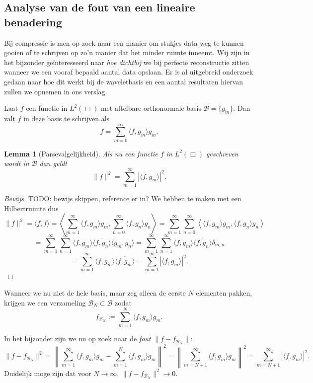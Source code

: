 \documentclass[11pt]{report}
\theoremstyle{plain}
\newtheorem*{lemm}{Lemma}
\theoremstyle{remark}
\begin{document}
\subsection{Analyse van de fout van een lineaire benadering}
Bij compressie is men op zoek naar een manier om stukjes data weg te kunnen gooien of te schrijven op zo'n manier dat het minder ruimte inneemt. Wij zijn in het bijzonder ge\"interesseerd naar \emph{hoe dichtbij} we bij perfecte reconstructie zitten wanneer we een vooraf bepaald aantal data opslaan. Er is al uitgebreid onderzoek gedaan naar hoe dit werkt bij de waveletbasis en een aantal resultaten hiervan zullen we opnemen in ons verslag.

Laat $f$ een functie in $L^2(\Box)$ met aftelbare orthonormale basis $\mathcal{B} = \{ g_m \}$. Dan valt $f$ in deze basis te schrijven als
\[
	f = \sum_{m = 0}^\infty \langle f, g_m \rangle g_m.
\]

\begin{lemm}[Parsevalgelijkheid\cite{parseval}]
Als nu een functie $f$ in $L^2(\Box)$ geschreven wordt in $\mathcal{B}$ dan geldt
\[
	\|f\|^2 = \sum_{m=1}^\infty | \langle f, g_m \rangle |^2.
\]
\end{lemm}
\begin{proof}[Bewijs]
  TODO: bewijs skippen, reference er in?
We hebben te maken met een Hilbertruimte dus
\[
\|f\|^2 = \langle f, f \rangle = \left\langle \sum_{m=1}^\infty \langle f, g_m \rangle g_m, \sum_{n=0}^\infty \langle f, g_n \rangle g_n \right\rangle = \sum_{m=1}^\infty \sum_{n=0}^\infty \left\langle \langle f, g_m \rangle g_m, \langle f, g_n \rangle g_n \right \rangle
\]
\[
 = \sum_{m=1}^\infty \sum_{n=1}^\infty \langle f, g_m \rangle \overline{\langle f, g_n \rangle}\langle g_m, g_n \rangle = \sum_{m=1}^\infty \sum_{n=1}^\infty \langle f, g_m \rangle \overline{\langle f, g_n \rangle} \delta_{m,n} 
\]
\[ = \sum_{m=1}^\infty \langle f, g_m \rangle \overline{\langle f, g_m \rangle} = \sum_{m=1}^\infty |\langle f, g_m \rangle |^2.
\]
\end{proof}

Wanneer we nu niet de hele basis, maar zeg alleen de eerste $N$ elementen pakken, krijgen we een verzameling $\mathcal{B}_N \subset \mathcal{B}$ zodat
\[
	f_{\mathcal{B}_N} := \sum_{m = 1}^N \langle f, g_m \rangle g_m.
\]

In het bijzonder zijn we nu op zoek naar de \emph{fout} $\| f - f_{\mathcal{B}_N} \|$:
\[
	\| f - f_{\mathcal{B}_N} \|^2 = \left\| \sum_{m=1}^\infty\langle f, g_m \rangle g_m - \sum_{m=1}^N \langle f, g_m \rangle g_m \right\|^2 = \left\| \sum_{m=N+1}^\infty\langle f, g_m \rangle g_m \right\|^2 = \sum_{m=N+1}^\infty | \langle f, g_m \rangle |^2.
\]
Duidelijk moge zijn dat voor $N \to \infty$, $\| f - f_{\mathcal{B}_N} \|^2 \to 0$.
\end{document}
